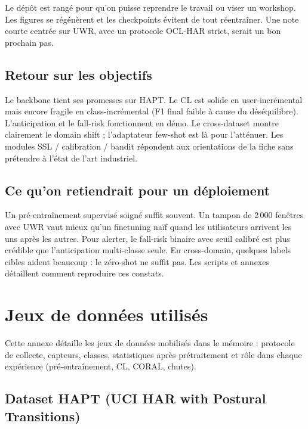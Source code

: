 \documentclass[a4paper,12pt]{report}
\begin{document}
Le dépôt est rangé pour qu'on puisse reprendre le travail ou viser un
workshop. Les figures se régénèrent et les checkpoints évitent de tout
réentraîner. Une note courte centrée sur UWR, avec un protocole OCL-HAR
strict, serait un bon prochain pas.

\section{Retour sur les objectifs}

Le backbone tient ses promesses sur HAPT. Le CL est solide en user-incrémental
mais encore fragile en class-incrémental (F1 final faible à cause du
déséquilibre). L'anticipation et le fall-risk fonctionnent en démo. Le
cross-dataset montre clairement le domain shift ; l'adaptateur few-shot est
là pour l'atténuer. Les modules SSL / calibration / bandit répondent aux
orientations de la fiche sans prétendre à l'état de l'art industriel.

\section{Ce qu'on retiendrait pour un déploiement}

Un pré-entraînement supervisé soigné suffit souvent. Un tampon de 2\,000
fenêtres avec UWR vaut mieux qu'un finetuning naïf quand les utilisateurs
arrivent les uns après les autres. Pour alerter, le fall-risk binaire avec
seuil calibré est plus crédible que l'anticipation multi-classe seule. En
cross-domain, quelques labels cibles aident beaucoup : le zéro-shot ne
suffit pas. Les scripts et annexes détaillent comment reproduire ces
constats.



\printbibliography[title={Bibliographie}]

\appendix

\chapter{Jeux de données utilisés}
\label{app:datasets}

Cette annexe détaille les jeux de données mobilisés dans le mémoire : protocole
de collecte, capteurs, classes, statistiques après prétraitement et rôle dans
chaque expérience (pré-entraînement, CL, CORAL, chutes).

\section{Dataset HAPT (UCI HAR with Postural Transitions)}
\end{document}
